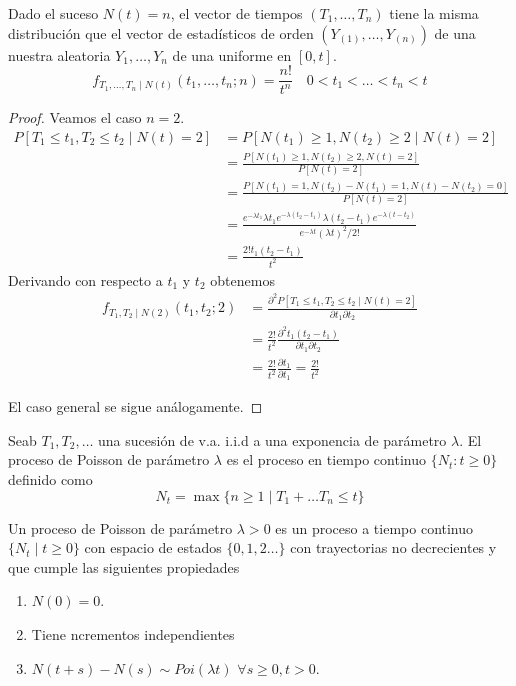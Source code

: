 \documentclass[PREyA.tex]{subfiles}
\begin{document}
\begin{prop}
Dado el suceso $N(t)=n$, el vector de tiempos $(T_1,\dotsc,T_n)$ tiene la misma distribución que el vector de estadísticos de orden $(Y_{(1)},\dotsc,Y_{(n)})$ de una nuestra aleatoria $Y_1,\dotsc,Y_n$ de una uniforme en $[0,t]$.
$$
f_{T_1,\dotsc,T_n\mid N(t)}(t_1,\dotsc,t_n;n) = \frac{n!}{t^n} \quad 0<t_1<\dotsc<t_n < t
$$
\end{prop}
\begin{proof}
Veamos el caso $n=2$.
\begin{align*}
P[T_1\leq t_1,T_2 \leq t_2 \mid N(t)=2] & = P[N(t_1) \geq 1, N(t_2)\geq 2 \mid N(t)=2]\\
&= \frac{ P[N(t_1) \geq 1, N(t_2)\geq 2, N(t)=2]}{P[N(t)=2]}\\
&= \frac{P[N(t_1)=1,N(t_2)-N(t_1) =1, N(t)-N(t_2)=0]}{P[N(t)=2]}\\
&= \frac{e^{-\lambda t_1}\lambda t_1 e^{-\lambda(t_2-t_1)}\lambda(t_2-t_1) e^{-\lambda(t-t_2)}}{e^{-\lambda t}(\lambda t)^2/2!}\\
&= \frac{2!t_1(t_2-t_1)}{t^2}
\end{align*}
Derivando con respecto a $t_1$ y $t_2$ obtenemos 
\begin{align*}
f_{T_1,T_2\mid N(2)}(t_1,t_2;2) &= \frac{\partial^2 P[T_1\leq t_1,T_2 \leq t_2 \mid N(t)=2] }{\partial t_1 \partial t_2}\\
&= \frac{2!}{t^2}\frac{\partial^2 t_1(t_2-t_1)}{\partial t_1 \partial t_2}\\
&=\frac{2!}{t^2}\frac{\partial t_1}{\partial t_1} = \frac{2!}{t^2}
\end{align*}

El caso general se sigue análogamente.
\end{proof}
\begin{defi}
Seab $T_1,T_2,\dotsc$ una sucesión de v.a. i.i.d  a una exponencia de parámetro $\lambda$. El proceso de Poisson de parámetro $\lambda$ es el proceso en tiempo continuo $\{N_t:t\geq 0\}$ definido como 
$$
N_t = \max\{n\geq 1\mid T_1+\dotsc T_n \leq t\}
$$
\end{defi}
\begin{defi}
Un proceso de Poisson de parámetro $\lambda > 0$ es un proceso a tiempo continuo $\{N_t \mid t\geq0\}$ con espacio de estados $\{0,1,2\dotsc\}$ con trayectorias no decrecientes y que cumple las siguientes propiedades
\begin{enumerate}
\item $N(0)=0$.
\item Tiene ncrementos independientes
\item $N(t+s)-N(s) \sim Poi(\lambda t)$ $\forall s\geq 0, t>0$.
\end{enumerate}
\end{defi}
\end{document}
